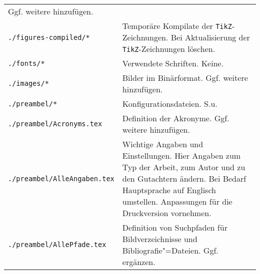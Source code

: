 \begin{longtable}{l@{\extracolsep{8pt}}X}
                                          Ggf. weitere hinzufügen.\\
\texttt{./figures-compiled/*}             & Temporäre Kompilate der \texttt{TikZ}-Zeichnungen.
                                          Bei Aktualisierung der \texttt{TikZ}-Zeichnungen löschen.\\
\texttt{./fonts/*}                        & Verwendete Schriften. Keine.\\
\texttt{./images/*}                       & Bilder im Binärformat. %
                                          Ggf. weitere hinzufügen. \\
\texttt{./preambel/*}                     & Konfigurationsdateien. S.u.\\
\texttt{./preambel/Acronyms.tex}          & Definition der Akronyme.
                                          Ggf. weitere hinzufügen.\\
\texttt{./preambel/AlleAngaben.tex}       & Wichtige Angaben und Einstellungen.
                                          Hier Angaben zum Typ der Arbeit, zum Autor und zu den Gutachtern ändern.
                                          Bei Bedarf Hauptsprache auf Englisch umstellen.
                                          Anpassungen für die Druckversion vornehmen.\\
\texttt{./preambel/AllePfade.tex}         & Definition von Suchpfaden für Bildverzeichnisse und Bibliografie"=Dateien.
                                          Ggf. ergänzen.\\

\end{longtable}
